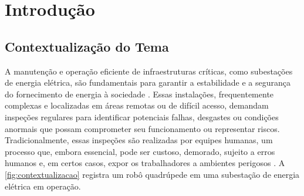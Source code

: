 \chapter[Introdução]{Introdução}
\label{cap:introducao}

\section{Contextualização do Tema}
A manutenção e operação eficiente de infraestruturas críticas, como subestações de energia elétrica, são fundamentais para garantir a estabilidade e a segurança do fornecimento de energia à sociedade \cite{suitelec2023}. Essas instalações, frequentemente complexas e localizadas em áreas remotas ou de difícil acesso, demandam inspeções regulares para identificar potenciais falhas, desgastes ou condições anormais que possam comprometer seu funcionamento ou representar riscos. Tradicionalmente, essas inspeções são realizadas por equipes humanas, um processo que, embora essencial, pode ser custoso, demorado, sujeito a erros humanos e, em certos casos, expor os trabalhadores a ambientes perigosos \cite{Li2025SafetyRisk}. A \autoref{fig:contextualizacao} registra um robô quadrúpede em uma subestação de energia elétrica em operação.

